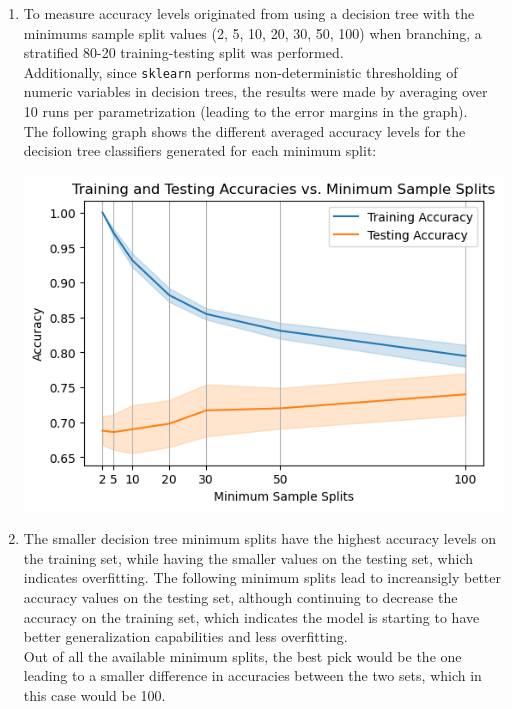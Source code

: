 \documentclass[12pt]{article}
\begin{document}
\begin{enumerate}[leftmargin=\labelsep, label=\textbf{\arabic*.)}]
\begin{center}
          \end{center}
    \item To measure accuracy levels originated from using a decision tree with the minimums sample split values (2, 5, 10, 20, 30, 50, 100) when branching, a stratified 80-20 training-testing split was performed. \\ \vspace{0.25em} Additionally, since \texttt{sklearn} performs non-deterministic thresholding of numeric variables in decision trees, the results were made by averaging over 10 runs per parametrization (leading to the error margins in the graph). \\ \vspace{0.25em} The following graph shows the different averaged accuracy levels for the decision tree classifiers generated for each minimum split: \\
          \begin{center}
              \includegraphics{split_training_results.png}
          \end{center}
    \item The smaller decision tree minimum splits have the highest accuracy levels on the training set, while having the smaller values on the testing set, which indicates overfitting.
          The following minimum splits lead to increansigly better accuracy values on the testing set, although continuing to decrease the accuracy on the training set, which indicates the model is starting to have better generalization capabilities and less overfitting. \\\vspace{0.25em}
          Out of all the available minimum splits, the best pick would be the one leading to a smaller difference in accuracies between the two sets, which in this case would be 100. \\\vspace{0.25em}

\end{enumerate}
\end{document}
